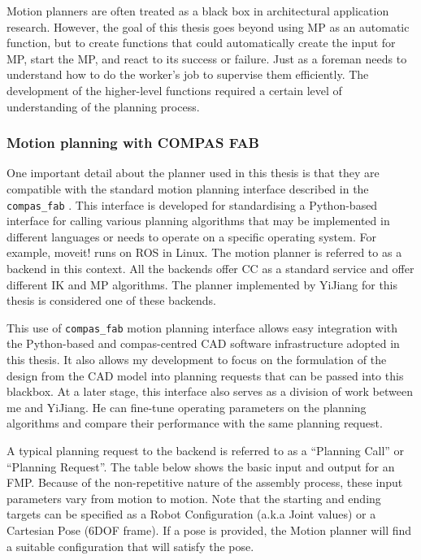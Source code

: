 Motion planners are often treated as a black box in architectural application research. However, the goal of this thesis goes beyond using MP as an automatic function, but to create functions that could automatically create the input for MP, start the MP, and react to its success or failure. Just as a foreman needs to understand how to do the worker’s job to supervise them efficiently. The development of the higher-level functions required a certain level of understanding of the planning process.

\subsubsection{Motion planning with COMPAS FAB}
\label{subsubsection:exploration_2_motion_planning_with_compas_fab}


One important detail about the planner used in this thesis is that they are compatible with the standard motion planning interface described in the \verb|compas_fab| \parencite{rustCOMPASFABRobotic2018}. This interface is developed for standardising a Python-based interface for calling various planning algorithms that may be implemented in different languages or needs to operate on a specific operating system. For example, moveit! \parencite{sucanMoveit2018} runs on ROS \parencite{quigleyROSOpensourceRobot2009} in Linux. The motion planner is referred to as a backend in this context. All the backends offer CC as a standard service and offer different IK and MP algorithms. The planner implemented by YiJiang \parencite{huangCompas_fab_pychoreo2023} for this thesis is considered one of these backends. 

This use of \verb|compas_fab| motion planning interface allows easy integration with the Python-based and compas-centred CAD software infrastructure adopted in this thesis. It also allows my development to focus on the formulation of the design from the CAD model into planning requests that can be passed into this blackbox. At a later stage, this interface also serves as a division of work between me and YiJiang. He can fine-tune operating parameters on the planning algorithms and compare their performance with the same planning request.

A typical planning request to the backend is referred to as a “Planning Call” or “Planning Request”. The table below shows the basic input and output for an FMP. Because of the non-repetitive nature of the assembly process, these input parameters vary from motion to motion. Note that the starting and ending targets can be specified as a Robot Configuration (a.k.a Joint values) or a Cartesian Pose (6DOF frame). If a pose is provided, the Motion planner will find a suitable configuration that will satisfy the pose.

